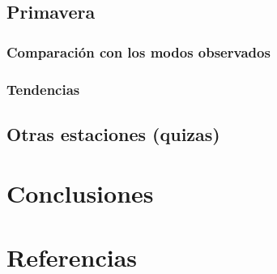 \documentclass[12pt,oneside]{reedthesis}
\begin{document}
\hypertarget{primavera-1}{%
\section{Primavera}\label{primavera-1}}

\hypertarget{comparaciuxf3n-con-los-modos-observados}{%
\subsection{Comparación con los modos observados}\label{comparaciuxf3n-con-los-modos-observados}}

\hypertarget{tendencias}{%
\subsection{Tendencias}\label{tendencias}}

\hypertarget{otras-estaciones-quizas}{%
\section{Otras estaciones (quizas)}\label{otras-estaciones-quizas}}

\hypertarget{conclusiones}{%
\chapter{Conclusiones}\label{conclusiones}}

\backmatter

\hypertarget{referencias}{%
\chapter*{Referencias}\label{referencias}}


\noindent

\setlength{\parindent}{-0.20in}
\end{document}

